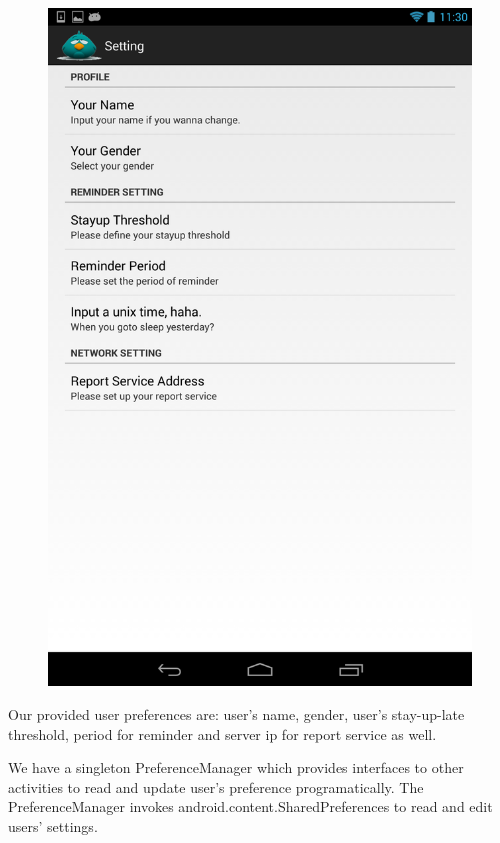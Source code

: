 \documentclass[14pt]{extreport}
\begin{document}
\begin{figure}[h]
\begin{center}
\includegraphics[width=5in]{setting}
\end{center}
\end{figure}

Our provided user preferences are: user's name, gender, user's stay-up-late threshold, period for reminder and server ip for report service as well.

We have a singleton PreferenceManager which provides interfaces to other activities to read and update user's preference programatically. The PreferenceManager invokes android.content.SharedPreferences to read and edit users' settings.
\end{document}

